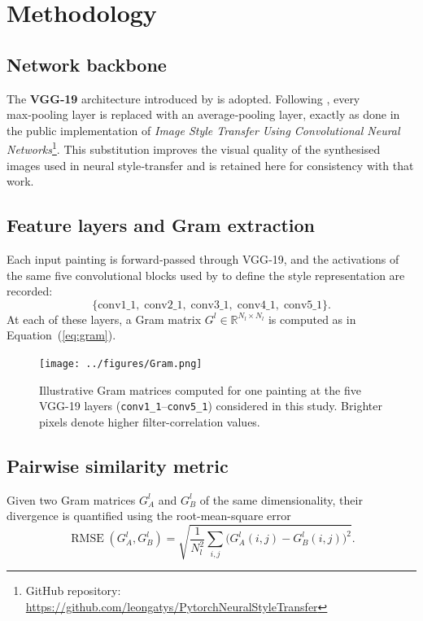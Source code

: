 \documentclass[a4paper,11pt]{article}
\begin{document}
\section{Methodology}

\subsection{Network backbone}
The \textbf{VGG‑19} architecture introduced by \textcite{simon2014vgg} is adopted. Following \textcite{gatys2016}, every max‑pooling layer is replaced with an average‑pooling layer, exactly as done in the public implementation of \emph{Image Style Transfer Using Convolutional Neural Networks}\footnote{GitHub repository: \url{https://github.com/leongatys/PytorchNeuralStyleTransfer}}. This substitution improves the visual quality of the synthesised images used in neural style‑transfer and is retained here for consistency with that work.

\subsection{Feature layers and Gram extraction}
Each input painting is forward‑passed through VGG‑19, and the activations of the same five convolutional blocks used by \textcite{gatys2016} to define the style representation are recorded:
\begin{equation*}
    \{\text{conv1\_1},\;\text{conv2\_1},\;\text{conv3\_1},\;\text{conv4\_1},\;\text{conv5\_1}\}.
\end{equation*}
At each of these layers, a Gram matrix $G^{l}\in\mathbb{R}^{N_{l}\times N_{l}}$ is computed as in Equation~(\ref{eq:gram}).

\begin{figure}[htbp]
    \centering
    \texttt{[image: ../figures/Gram.png]}
    \caption{Illustrative Gram matrices computed for one painting at the five VGG-19 layers (\texttt{conv1\_1}–\texttt{conv5\_1}) considered in this study. Brighter pixels denote higher filter-correlation values.}
    \label{fig:gram_example}
\end{figure}

\subsection{Pairwise similarity metric}
Given two Gram matrices $G^{l}_{A}$ and $G^{l}_{B}$ of the same dimensionality, their divergence is quantified using the root-mean-square error
\begin{equation}
    \operatorname{RMSE}(G^{l}_{A},G^{l}_{B}) = \sqrt{ \frac{1}{N_{l}^{2}} \sum_{i,j} \bigl(G^{l}_{A}(i,j)-G^{l}_{B}(i,j)\bigr)^{2} }.
\end{equation}
\end{document}
